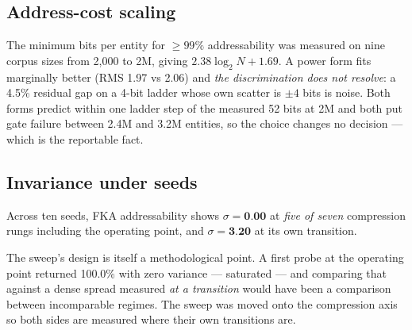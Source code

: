 \subsection{Address-cost scaling}

The minimum bits per entity for $\ge 99\%$ addressability was measured on nine corpus sizes from
2{,}000 to 2M, giving $2.38\log_2 N + 1.69$. A power form fits marginally better
(RMS 1.97 vs 2.06) and \emph{the discrimination does not resolve}: a 4.5\% residual gap on a 4-bit
ladder whose own scatter is $\pm 4$ bits is noise. Both forms predict within one ladder step of the
measured 52 bits at 2M and both put gate failure between 2.4M and 3.2M entities, so the
choice changes no decision --- which is the reportable fact.


\subsection{Invariance under seeds}

Across ten seeds, FKA addressability shows $\sigma = \textbf{0.00}$ at \emph{five of seven}
compression rungs including the operating point, and $\sigma = \textbf{3.20}$ at its own
transition.

The sweep's design is itself a methodological point. A first probe at the operating point returned
100.0\% with zero variance --- saturated --- and comparing that against a dense spread measured
\emph{at a transition} would have been a comparison between incomparable regimes. The sweep was
moved onto the compression axis so both sides are measured where their own transitions are.

